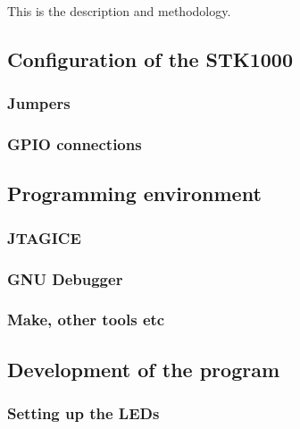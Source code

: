 This is the description and methodology.

\subsection{Configuration of the STK1000}

    \subsubsection{Jumpers}

        

    \subsubsection{GPIO connections}

        

\subsection{Programming environment}

    \subsubsection{JTAGICE}

        

    \subsubsection{GNU Debugger}
        

    \subsubsection{Make, other tools etc}

\subsection{Development of the program}

    \subsubsection{Setting up the LEDs}
        
        

